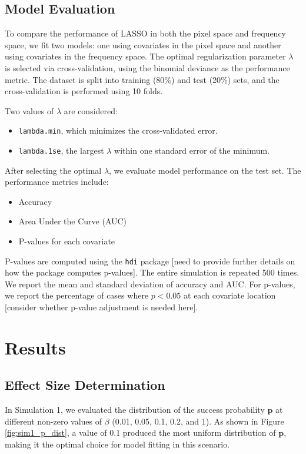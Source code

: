 \documentclass[12pt]{article}
\begin{document}
\subsection*{Model Evaluation}

To compare the performance of LASSO in both the pixel space and frequency space, we fit two models: one using covariates in the pixel space and another using covariates in the frequency space. The optimal regularization parameter \( \lambda \) is selected via cross-validation, using the binomial deviance as the performance metric. The dataset is split into training (80\%) and test (20\%) sets, and the cross-validation is performed using 10 folds.

Two values of \( \lambda \) are considered: 
\begin{itemize}
  \item \texttt{lambda.min}, which minimizes the cross-validated error.
  \item \texttt{lambda.1se}, the largest \( \lambda \) within one standard error of the minimum.
\end{itemize}

After selecting the optimal \( \lambda \), we evaluate model performance on the test set. The performance metrics include:
\begin{itemize}
  \item Accuracy
  \item Area Under the Curve (AUC)
  \item P-values for each covariate
\end{itemize}

P-values are computed using the \texttt{hdi} package [need to provide further details on how the package computes p-values]. The entire simulation is repeated 500 times. We report the mean and standard deviation of accuracy and AUC. For p-values, we report the percentage of cases where \( p < 0.05 \) at each covariate location [consider whether p-value adjustment is needed here].


\section*{Results}

\subsection*{Effect Size Determination}

In Simulation 1, we evaluated the distribution of the success probability \( \mathbf{p} \) at different non-zero values of \( \beta \) (0.01, 0.05, 0.1, 0.2, and 1). As shown in Figure \ref{fig:sim1_p_dist}, a value of 0.1 produced the most uniform distribution of \( \mathbf{p} \), making it the optimal choice for model fitting in this scenario.
\end{document}
